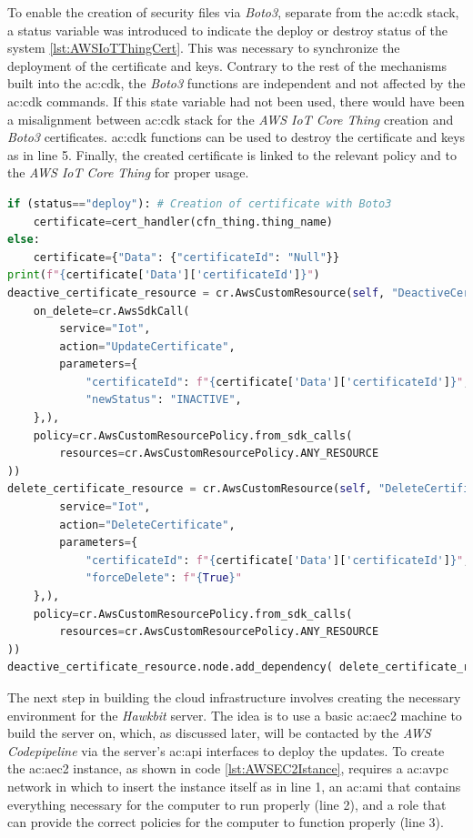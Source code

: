To enable the creation of security files via \textit{Boto3}, separate from the \gls{ac:cdk} stack, a status variable was introduced to indicate the deploy or destroy status of the system \ref{lst:AWSIoTThingCert}. This was necessary to synchronize the deployment of the certificate and keys. Contrary to the rest of the mechanisms built into the \gls{ac:cdk}, the \textit{Boto3} functions are independent and not affected by the \gls{ac:cdk} commands. If this state variable had not been used, there would have been a misalignment between \gls{ac:cdk} stack for the \textit{AWS IoT Core Thing} creation and \textit{Boto3} certificates. \gls{ac:cdk} functions can be used to destroy the certificate and keys as in line 5. Finally, the created certificate is linked to the relevant policy and to the \textit{AWS IoT Core Thing} for proper usage.
\begin{lstlisting}[language=Python, caption={Code for the creation and destruction of \textit{AWS IoT Core Thing} certificates and keys from the \gls{ac:cdk} stack}, label=lst:AWSIoTThingCert]
if (status=="deploy"): # Creation of certificate with Boto3
    certificate=cert_handler(cfn_thing.thing_name)
else:
    certificate={"Data": {"certificateId": "Null"}}
print(f"{certificate['Data']['certificateId']}")
deactive_certificate_resource = cr.AwsCustomResource(self, "DeactiveCertificateResource",
    on_delete=cr.AwsSdkCall(
        service="Iot",
        action="UpdateCertificate",
        parameters={
            "certificateId": f"{certificate['Data']['certificateId']}",
            "newStatus": "INACTIVE",
    },),
    policy=cr.AwsCustomResourcePolicy.from_sdk_calls(
        resources=cr.AwsCustomResourcePolicy.ANY_RESOURCE
))
delete_certificate_resource = cr.AwsCustomResource(self, "DeleteCertificateResource", # Destruction of certificates
        service="Iot",
        action="DeleteCertificate",
        parameters={
            "certificateId": f"{certificate['Data']['certificateId']}",
            "forceDelete": f"{True}"
    },),
    policy=cr.AwsCustomResourcePolicy.from_sdk_calls(
        resources=cr.AwsCustomResourcePolicy.ANY_RESOURCE
))
deactive_certificate_resource.node.add_dependency( delete_certificate_resource )
\end{lstlisting}

The next step in building the cloud infrastructure involves creating the necessary environment for the \textit{Hawkbit} server. The idea is to use a basic \gls{ac:aec2} machine to build the server on, which, as discussed later, will be contacted by the \textit{AWS Codepipeline} via the server's \gls{ac:api} interfaces to deploy the updates. To create the \gls{ac:aec2} instance, as shown in code \ref{lst:AWSEC2Istance}, requires a \gls{ac:avpc} network in which to insert the instance itself as in line 1, an \gls{ac:ami} that contains everything necessary for the computer to run properly (line 2), and a role that can provide the correct policies for the computer to function properly (line 3).

